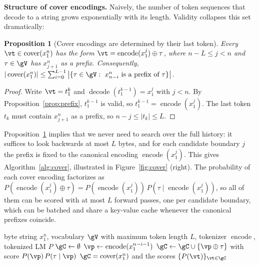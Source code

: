 \documentclass{article} %
\newtheorem{proposition}{Proposition}
\newcommand{\enc}{\operatorname{encode}}
\newcommand{\dec}{\operatorname{decode}}
\newcommand{\cover}{\operatorname{cover}}
\begin{document}
\textbf{Structure of cover encodings.} Naively, the number of token sequences that decode to a string grows exponentially with its length. Validity collapses this set dramatically:

\begin{proposition}[Cover encodings are determined by their last token]
\label{prop:structure}
Every $\vt\in\cover(x_1^n)$ has the form $\vt=\enc(x_1^{j})\oplus\tau$, where $n-L\leq j<n$ and $\tau\in\gV$ has $x_{j+1}^n$ as a prefix. Consequently, $|\cover(x_1^n)|\leq\sum_{i=0}^{L-1}\big|\{\tau\in\gV:\ x_{n-i}^n \text{ is a prefix of } \tau\}\big|$.
\end{proposition}
\begin{proof}
Write $\vt=t_1^k$ and $\dec(t_1^{k-1})=x_1^j$ with $j<n$. By Proposition~\ref{prop:prefix}, $t_1^{k-1}$ is valid, so $t_1^{k-1}=\enc(x_1^j)$. The last token $t_k$ must contain $x_{j+1}^n$ as a prefix, so $n-j\leq|t_k|\leq L$.
\end{proof}

Proposition~\ref{prop:structure} implies that we never need to search over the full history: it suffices to look backwards at most $L$ bytes, and for each candidate boundary $j$ the prefix is fixed to the canonical encoding $\enc(x_1^j)$. This gives Algorithm~\ref{alg:cover}, illustrated in Figure~\ref{fig:cover} (right). The probability of each cover encoding factorizes as $P(\enc(x_1^j)\oplus\tau)=P(\enc(x_1^j))\,P(\tau\mid\enc(x_1^j))$, so all of them can be scored with at most $L$ forward passes, one per candidate boundary, which can be batched and share a key-value cache whenever the canonical prefixes coincide.

\begin{algorithm}[t]
\caption{Cover encoding search by backward tokenization}
\label{alg:cover}
\begin{algorithmic}[1]
\Require byte string $x_1^n$, vocabulary $\gV$ with maximum token length $L$, tokenizer $\enc$, tokenized LM $P$
\State $\gC\gets\emptyset$
 
  \State $\vp\gets\enc(x_1^{n-i-1})$ 
    \If{$\enc(\dec(\vp\oplus\tau))=\vp\oplus\tau$} 
      \State $\gC\gets\gC\cup\{\vp\oplus\tau\}$ with score $P(\vp)\,P(\tau\mid\vp)$
    \EndIf
  \EndFor
\EndFor
\State \Return $\gC=\cover(x_1^n)$ and the scores $\{P(\vt)\}_{\vt\in\gC}$
\end{algorithmic}
\end{algorithm}
\end{document}
